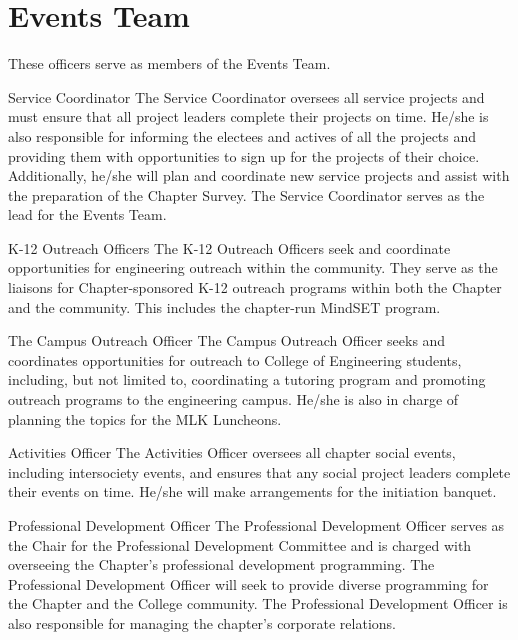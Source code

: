 \section{Events Team}
These officers serve as members of the Events Team.
\begin{enumsubsection}
\item{Service Coordinator} The Service Coordinator oversees all service projects and must ensure that all project leaders complete their projects on time. He/she is also responsible for informing the electees and actives of all the projects and providing them with opportunities to sign up for the projects of their choice. Additionally, he/she will plan and coordinate new service projects and assist with the preparation of the Chapter Survey. The Service Coordinator serves as the lead for the Events Team. 

\item{ K-12 Outreach Officers} The K-12 Outreach Officers seek and coordinate opportunities for engineering outreach within the community.  They serve as the liaisons for Chapter-sponsored K-12 outreach programs within both the Chapter and the community. This includes the chapter-run MindSET program. 

\item{The Campus Outreach Officer} The Campus Outreach Officer seeks and coordinates opportunities for outreach to College of Engineering students, including, but not limited to, coordinating a tutoring program and promoting outreach programs to the engineering campus. He/she is also in charge of planning the topics for the MLK Luncheons.

\item{Activities Officer} The Activities Officer oversees all chapter social events, including intersociety events, and ensures that any social project leaders complete their events on time. He/she will make arrangements for the initiation banquet. 

\item{Professional Development Officer} The Professional Development Officer serves as the Chair for the Professional Development Committee and is charged with overseeing the Chapter's professional development programming. The Professional Development Officer will seek to provide diverse programming for the Chapter and the College community. The Professional Development Officer is also responsible for managing the chapter's corporate relations.  
\end{enumsubsection}

